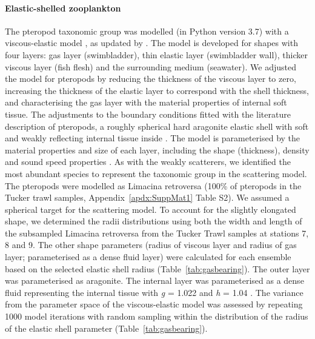 \paragraph{Elastic-shelled zooplankton}
The pteropod taxonomic group was modelled (in Python version 3.7) with a viscous-elastic model \citep{Feuillade1998}, as updated by \citealt{Khodabandeloo2021}. The model is developed for shapes with four layers: gas layer (swimbladder), thin elastic layer (swimbladder wall), thicker viscous layer (fish flesh) and the surrounding medium (seawater). We adjusted the model for pteropods by reducing the thickness of the viscous layer to zero, increasing the thickness of the elastic layer to correspond with the shell thickness, and characterising the gas layer with the material properties of internal soft tissue. The adjustments to the boundary conditions fitted with the literature description of pteropods, a roughly spherical hard aragonite elastic shell with soft and weakly reflecting internal tissue inside \citep{Lavery2007, Simmonds2008}. The model is parameterised by the material properties and size of each layer, including the shape (thickness), density and sound speed properties \citep{Khodabandeloo2021}. As with the weakly scatterers, we identified the most abundant species to represent the taxonomic group in the scattering model. The pteropods were modelled as Limacina retroversa (100\% of pteropods in the Tucker trawl samples, Appendix~\ref{apdx:SuppMat1} Table S2). We assumed a spherical target for the scattering model. To account for the slightly elongated shape, we determined the radii distributions using both the width and length of the subsampled Limacina retroversa from the Tucker Trawl samples at stations 7, 8 and 9. The other shape parameters (radius of viscous layer and radius of gas layer; parameterised as a dense fluid layer) were calculated for each ensemble based on the selected elastic shell radius (Table~\ref{tab:gasbearing}). The outer layer was parameterised as aragonite. The internal layer was parameterised as a dense fluid representing the internal tissue with \textit{g} = 1.022 and \textit{h} = 1.04 \citep{Lavery2007}. The variance from the parameter space of the viscous-elastic model was assessed by repeating 1000 model iterations with random sampling within the distribution of the radius of the elastic shell parameter (Table~\ref{tab:gasbearing}).

